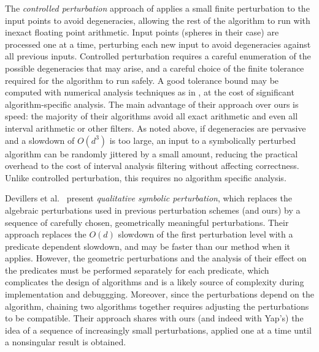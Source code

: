 \documentclass[11pt]{article}
\begin{document}
The \emph{controlled perturbation} approach of \cite{halperin1998perturbation} applies a small finite perturbation to the input points to avoid degeneracies, allowing the rest
of the algorithm to run with inexact floating point arithmetic.  Input points (spheres in their case) are processed one at a time, perturbing each new input to avoid degeneracies
against all previous inputs.  Controlled perturbation requires a careful enumeration of the possible degeneracies that may arise, and a careful choice of the finite tolerance
required for the algorithm to run safely.  A good tolerance bound may be computed with numerical analysis techniques as in \cite{halperin2004controlled}, at the cost of significant
algorithm-specific analysis.  The main advantage of their approach over ours is speed: the majority of their algorithms avoid all exact arithmetic and even all interval arithmetic
or other filters.  As noted above, if degeneracies are pervasive and a slowdown of $O(d^3)$ is too large, an input to a symbolically perturbed algorithm can be randomly
jittered by a small amount, reducing the practical overhead to the cost of interval analysis filtering without affecting correctness.  Unlike controlled perturbation, this requires
no algorithm specific analysis. 

Devillers et al.\ \cite{devillers2012qualitative} present \emph{qualitative symbolic perturbation}, which replaces the algebraic perturbations used in previous perturbation schemes (and ours)
by a sequence of carefully chosen, geometrically meaningful perturbations.  Their approach replaces the $O(d)$ slowdown of the first perturbation level with a predicate dependent
slowdown, and may be faster than our method when it applies.  However, the geometric perturbations and the analysis of their effect on the predicates must be performed separately for each
predicate, which complicates the design of algorithms and is a likely source of complexity during implementation and debuggging.  Moreover, since the perturbations depend on the
algorithm, chaining two algorithms together requires adjusting the perturbations to be compatible.  Their approach shares with ours (and indeed
with Yap's) the idea of a sequence of increasingly small perturbations, applied one at a time until a nonsingular result is obtained.
\end{document}
